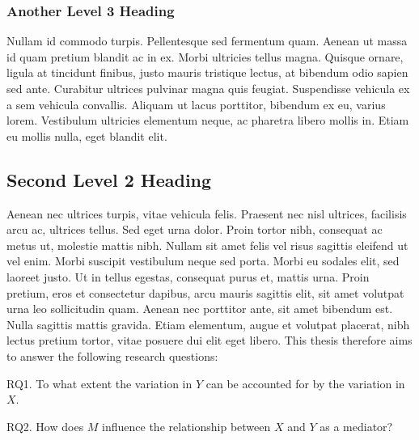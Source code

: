 \subsubsection{Another Level 3 Heading}

Nullam id commodo turpis. Pellentesque sed fermentum quam. Aenean ut massa id quam pretium blandit ac in ex. Morbi ultricies tellus magna. Quisque ornare, ligula at tincidunt finibus, justo mauris tristique lectus, at bibendum odio sapien sed ante. Curabitur ultrices pulvinar magna quis feugiat. Suspendisse vehicula ex a sem vehicula convallis. Aliquam ut lacus porttitor, bibendum ex eu, varius lorem. Vestibulum ultricies elementum neque, ac pharetra libero mollis in. Etiam eu mollis nulla, eget blandit elit.

\subsection{Second Level 2 Heading}

Aenean nec ultrices turpis, vitae vehicula felis. Praesent nec nisl ultrices, facilisis arcu ac, ultrices tellus. Sed eget urna dolor. Proin tortor nibh, consequat ac metus ut, molestie mattis nibh. Nullam sit amet felis vel risus sagittis eleifend ut vel enim. Morbi suscipit vestibulum neque sed porta. Morbi eu sodales elit, sed laoreet justo. Ut in tellus egestas, consequat purus et, mattis urna. Proin pretium, eros et consectetur dapibus, arcu mauris sagittis elit, sit amet volutpat urna leo sollicitudin quam. Aenean nec porttitor ante, sit amet bibendum est. Nulla sagittis mattis gravida. Etiam elementum, augue et volutpat placerat, nibh lectus pretium tortor, vitae posuere dui elit eget libero. This thesis therefore aims to answer the following research questions:
\begin{MAEitemize}
    \item[RQ1.] To what extent the variation in $Y$ can be accounted for by the variation in $X$.
    \item[RQ2.] How does $M$ influence the relationship between $X$ and $Y$ as a mediator?
\end{MAEitemize}
